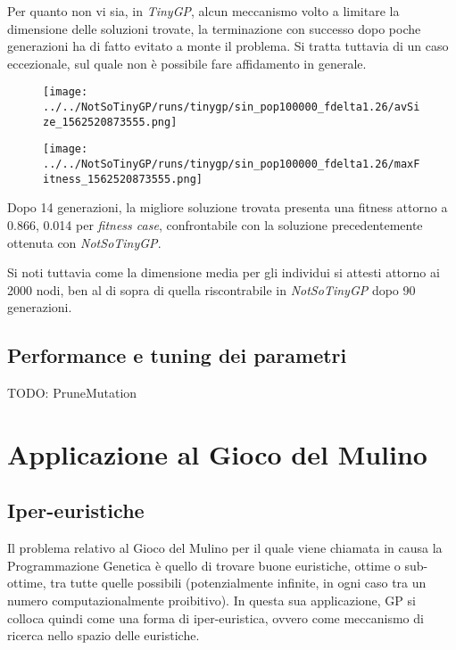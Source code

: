 \documentclass{../llncs}
\newcommand{\labelfig}[1]{\label{fig:#1}}
\begin{document}
Per quanto non vi sia, in \emph{TinyGP}, alcun meccanismo volto a limitare la dimensione delle soluzioni trovate, la terminazione con successo dopo poche generazioni ha di fatto evitato a monte il problema. Si tratta tuttavia di un caso eccezionale, sul quale non è possibile fare affidamento in generale.\\

\begin{figure}[!htb]
\centering
\texttt{[image: ../../NotSoTinyGP/runs/tinygp/sin\_pop100000\_fdelta1.26/avSize\_1562520873555.png]}
\end{figure}

\begin{figure}[!htb]
\centering
\texttt{[image: ../../NotSoTinyGP/runs/tinygp/sin\_pop100000\_fdelta1.26/maxFitness\_1562520873555.png]}
\end{figure}

Dopo 14 generazioni, la migliore soluzione trovata presenta una fitness attorno a 0.866, 0.014 per \emph{fitness case}, confrontabile con la soluzione precedentemente ottenuta con \emph{NotSoTinyGP}.

Si noti tuttavia come la dimensione media per gli individui si attesti attorno ai 2000 nodi, ben al di sopra di quella riscontrabile in \emph{NotSoTinyGP} dopo 90 generazioni.

\subsection{Performance e tuning dei parametri}
TODO: PruneMutation

\section{Applicazione al Gioco del Mulino}
\subsection{Iper-euristiche}
Il problema relativo al Gioco del Mulino per il quale viene chiamata in causa la Programmazione Genetica è quello di trovare buone euristiche, ottime o sub-ottime, tra tutte quelle possibili (potenzialmente infinite, in ogni caso tra un numero computazionalmente proibitivo). In questa sua applicazione, GP si colloca quindi come una forma di iper-euristica, ovvero come meccanismo di ricerca nello spazio delle euristiche.
\end{document}
